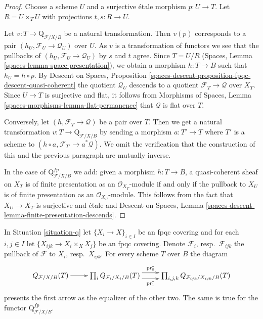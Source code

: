 \begin{proof}
Choose a scheme $U$ and a surjective \'etale morphism $p : U \to T$.
Let $R = U \times_T U$ with projections $t, s : R \to U$.

\medskip\noindent
Let $v : T \to \text{Q}_{\mathcal{F}/X/B}$
be a natural transformation. Then $v(p)$ corresponds to a pair
$(h_U, \mathcal{F}_U \to \mathcal{Q}_U)$ over $U$.
As $v$ is a transformation of functors we see
that the pullbacks of $(h_U, \mathcal{F}_U \to \mathcal{Q}_U)$
by $s$ and $t$ agree.
Since $T = U/R$ (Spaces, Lemma \ref{spaces-lemma-space-presentation}),
we obtain a morphism $h : T \to B$ such that
$h_U = h \circ p$. By Descent on Spaces, Proposition
\ref{spaces-descent-proposition-fpqc-descent-quasi-coherent}
the quotient $\mathcal{Q}_U$ descends to a quotient
$\mathcal{F}_T \to \mathcal{Q}$ over $X_T$.
Since $U \to T$ is surjective and flat, it follows from
Morphisms of Spaces, Lemma \ref{spaces-morphisms-lemma-flat-permanence}
that $\mathcal{Q}$ is flat over $T$.

\medskip\noindent
Conversely, let $(h, \mathcal{F}_T \to \mathcal{Q})$ be a pair over $T$.
Then we get a natural transformation
$v : T \to \text{Q}_{\mathcal{F}/X/B}$
by sending a morphism $a : T' \to T$ where $T'$ is a scheme
to $(h \circ a, \mathcal{F}_{T'} \to a^*\mathcal{Q})$.
We omit the verification that the construction
of this and the previous paragraph are mutually inverse.

\medskip\noindent
In the case of $\text{Q}^{fp}_{\mathcal{F}/X/B}$ we
add: given a morphism $h : T \to B$, a quasi-coherent sheaf
on $X_T$ is of finite presentation as an $\mathcal{O}_{X_T}$-module
if and only if the pullback to $X_U$ is of finite presentation as an
$\mathcal{O}_{X_U}$-module. This follows from the fact that
$X_U \to X_T$ is surjective and \'etale and
Descent on Spaces, Lemma
\ref{spaces-descent-lemma-finite-presentation-descends}.
\end{proof}

\begin{lemma}
\label{lemma-q-sheaf-in-X}
In Situation \ref{situation-q} let $\{X_i \to X\}_{i \in I}$ be an fpqc
covering and for each $i, j \in I$ let $\{X_{ijk} \to X_i \times_X X_j\}$
be an fpqc covering. Denote $\mathcal{F}_i$, resp.\ $\mathcal{F}_{ijk}$
the pullback of $\mathcal{F}$ to $X_i$, resp.\ $X_{ijk}$. For every scheme
$T$ over $B$ the diagram
$$
\xymatrix{
Q_{\mathcal{F}/X/B}(T) \ar[r] &
\prod\nolimits_i
Q_{\mathcal{F}_i/X_i/B}(T)
\ar@<1ex>[r]^-{\text{pr}_0^*} \ar@<-1ex>[r]_-{\text{pr}_1^*}
&
\prod\nolimits_{i, j, k}
Q_{\mathcal{F}_{ijk}/X_{ijk}/B}(T)
}
$$
presents the first arrow as the equalizer of the other two.
The same is true for the functor $\text{Q}^{fp}_{\mathcal{F}/X/B}$.
\end{lemma}

